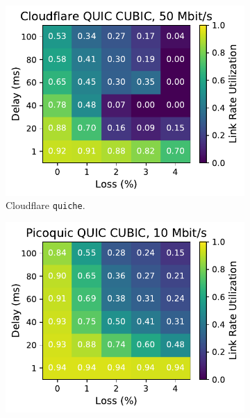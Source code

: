\begin{figure}[ht]
\begin{subfigure}[b]{0.22\linewidth}
        \includegraphics[width=\linewidth,trim={0 0 2cm 0},clip]{splitting/figures/heatmaps/heatmap_quiche_cubic_50mbps.pdf}
        \caption{Cloudflare \texttt{quiche}.}
    \end{subfigure}
    \begin{subfigure}[b]{0.22\linewidth}
        \includegraphics[width=\linewidth,trim={0 0 2cm 0},clip]{splitting/figures/heatmaps/heatmap_picoquic_cubic_10mbps.pdf}

\end{subfigure}
\end{figure}
